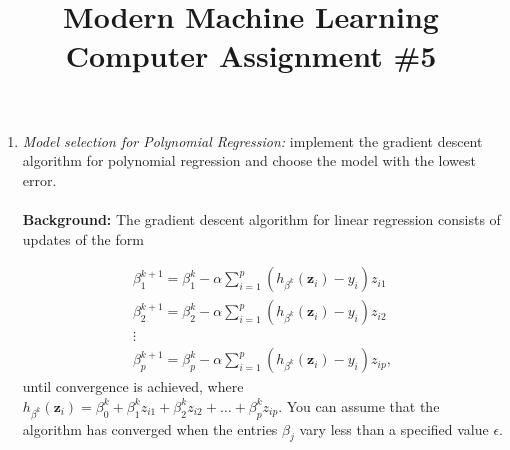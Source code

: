 \documentclass[11pt,oneside,a4paper]{article}
\begin{document}
\title{Modern Machine Learning\\Computer Assignment \#5}
\date{\vspace{-5ex}}
\maketitle
\begin{enumerate}
	
  \item \textit{Model selection for Polynomial Regression:} implement the gradient descent algorithm for polynomial regression and choose the model with the lowest error.
  \\
  \\
  \textbf{Background:} The gradient descent algorithm for linear regression consists of updates of the form
  
  \begin{equation}\nonumber
  \begin{aligned}
  \beta_1^{k+1}=\beta_1^{k}-\alpha\sum_{i=1}^{p}\left(h_{\beta^k}(\textbf{z}_i)-y_i\right)z_{i1}\\
  \beta_2^{k+1}=\beta_2^{k}-\alpha\sum_{i=1}^{p}\left(h_{\beta^k}(\textbf{z}_i)-y_i\right)z_{i2}\\
  \vdots\\
  \beta_p^{k+1}=\beta_p^{k}-\alpha\sum_{i=1}^{p}\left(h_{\beta^k}(\textbf{z}_i)-y_i\right)z_{ip},
  \end{aligned}
  \end{equation}  
  until convergence is achieved, where $h_{\beta^k}(\textbf{z}_i)=\beta_0^k+\beta_1^k z_{i1}+\beta_2^k z_{i2}+\dots+\beta_p^k z_{ip}$.  You can assume that the algorithm has converged when the entries $\beta_j$ vary less than a specified value $\epsilon$.
  

\end{enumerate}
\end{document}

